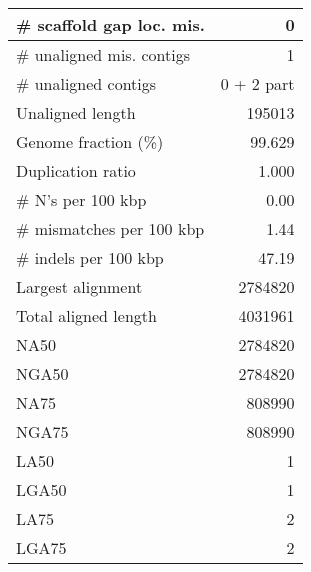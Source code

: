 \documentclass[12pt,a4paper]{article}
\begin{document}
\begin{table}[ht]
\begin{center}
\begin{tabular}{|l*{1}{|r}|}
\# scaffold gap loc. mis. & 0 \\ \hline
\# unaligned mis. contigs & 1 \\ \hline
\# unaligned contigs & 0 + 2 part \\ \hline
Unaligned length & 195013 \\ \hline
Genome fraction (\%) & 99.629 \\ \hline
Duplication ratio & 1.000 \\ \hline
\# N's per 100 kbp & 0.00 \\ \hline
\# mismatches per 100 kbp & 1.44 \\ \hline
\# indels per 100 kbp & 47.19 \\ \hline
Largest alignment & 2784820 \\ \hline
Total aligned length & 4031961 \\ \hline
NA50 & 2784820 \\ \hline
NGA50 & 2784820 \\ \hline
NA75 & 808990 \\ \hline
NGA75 & 808990 \\ \hline
LA50 & 1 \\ \hline
LGA50 & 1 \\ \hline
LA75 & 2 \\ \hline
LGA75 & 2 \\ \hline
\end{tabular}
\end{center}
\end{table}
\end{document}
